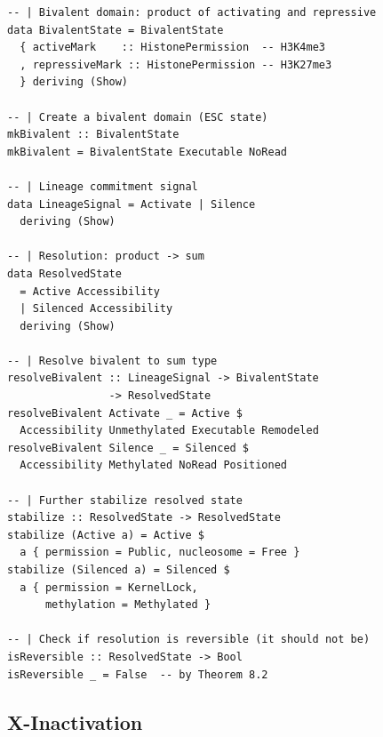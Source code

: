 \documentclass[12pt,a4paper]{article}
\begin{document}
\begin{lstlisting}[caption={Bivalent chromatin as type superposition}]
-- | Bivalent domain: product of activating and repressive
data BivalentState = BivalentState
  { activeMark    :: HistonePermission  -- H3K4me3
  , repressiveMark :: HistonePermission -- H3K27me3
  } deriving (Show)

-- | Create a bivalent domain (ESC state)
mkBivalent :: BivalentState
mkBivalent = BivalentState Executable NoRead

-- | Lineage commitment signal
data LineageSignal = Activate | Silence
  deriving (Show)

-- | Resolution: product -> sum
data ResolvedState
  = Active Accessibility
  | Silenced Accessibility
  deriving (Show)

-- | Resolve bivalent to sum type
resolveBivalent :: LineageSignal -> BivalentState
                -> ResolvedState
resolveBivalent Activate _ = Active $
  Accessibility Unmethylated Executable Remodeled
resolveBivalent Silence _ = Silenced $
  Accessibility Methylated NoRead Positioned

-- | Further stabilize resolved state
stabilize :: ResolvedState -> ResolvedState
stabilize (Active a) = Active $
  a { permission = Public, nucleosome = Free }
stabilize (Silenced a) = Silenced $
  a { permission = KernelLock,
      methylation = Methylated }

-- | Check if resolution is reversible (it should not be)
isReversible :: ResolvedState -> Bool
isReversible _ = False  -- by Theorem 8.2
\end{lstlisting}

\subsection{X-Inactivation}
\end{document}
